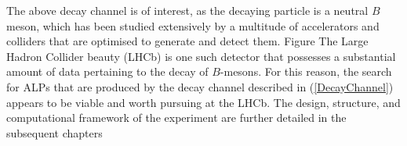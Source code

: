 The above decay channel is of interest, as the decaying particle is a neutral $B$ meson, which has been studied extensively by a multitude of accelerators and colliders that are optimised to generate and detect
them. Figure  The Large Hadron Collider beauty (LHCb) is one such detector that possesses a substantial amount of data pertaining to the decay of $B$-mesons. For this reason, the search for ALPs that are produced by the decay channel
described in (\ref{DecayChannel}) appears to be viable and worth pursuing at the LHCb. The design, structure, and computational framework of the experiment are further detailed in the subsequent chapters





